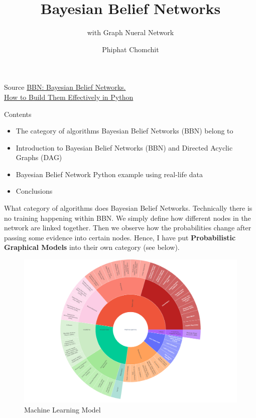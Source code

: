 \documentclass{beamer}
\title{Bayesian Belief Networks}
\subtitle{with Graph Nueral Network}
\author{Phiphat Chomchit}
\institute{Chiang Mai University}
\begin{document}
	
	\begin{frame}
		\titlepage
	\end{frame}

	\begin{frame}[t]{Source}
		\href{https://towardsdatascience.com/bbn-bayesian-belief-networks-how-to-build-them-effectively-in-python-6b7f93435bba}{BBN: Bayesian Belief Networks.\\ How to Build Them Effectively in Python}
	\end{frame}

	\begin{frame}[t]{Contents}
		\begin{itemize}
			\item The category of algorithms Bayesian Belief Networks (BBN) belong to
			\item Introduction to Bayesian Belief Networks (BBN) and Directed Acyclic Graphs (DAG)
			\item Bayesian Belief Network Python example using real-life data
			\item Conclusions
		\end{itemize}
	\end{frame}

	\begin{frame}[t]{What category of algorithms does Bayesian Belief Networks.}
		Technically there is no training happening within BBN. We simply define how different nodes in the network are linked together. Then we observe how the probabilities change after passing some evidence into certain nodes. Hence, I have put \textbf{Probabilistic Graphical Models} into their own category (see below).
		\begin{figure}
			\centering
			\includegraphics[scale=0.1]{newplot.png}
			\caption{Machine Learning Model}
		\end{figure}
	\end{frame}
\end{document}
